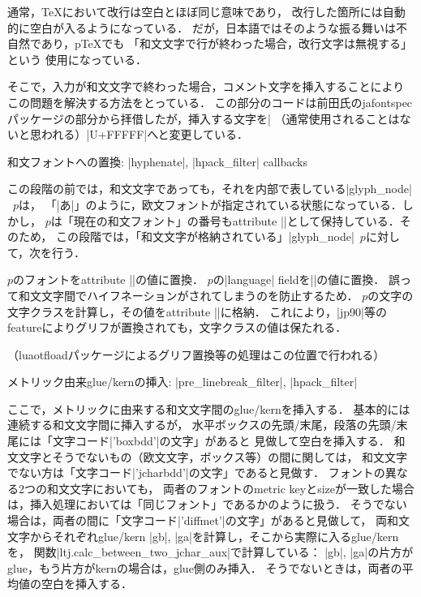 通常，\TeX において改行は空白とほぼ同じ意味であり，
改行した箇所には自動的に空白が入るようになっている．
だが，日本語ではそのような振る舞いは不自然であり，p\TeX でも
「和文文字で行が終わった場合，改行文字は無視する」という
使用になっている．

そこで，入力が和文文字で終わった場合，コメント文字を挿入することにより
この問題を解決する方法をとっている．
この部分のコードは前田氏のjafontspecパッケージの部分から拝借したが，挿入する文字を|%
（通常使用されることはないと思われる）|U+FFFFF|へと変更している．

\item 和文フォントへの置換: |hyphenate|, |hpack_filter| callbacks

この段階の前では，和文文字であっても，それを内部で表している|glyph_node|~$p$は，
「|\temrm あ|」のように，欧文フォントが指定されている状態になっている．しかし，
$p$は「現在の和文フォント」の番号もattribute |\luatexja@curjfn|として保持している．そのため，
この段階では，「和文文字が格納されている」|glyph_node|~$p$に対して，次を行う．

\itemitem $p$のフォントをattribute |\luatexja@curjfn|の値に置換．
\itemitem $p$の|language| fieldを|\luatexja@japanese|の値に置換．
誤って和文文字間でハイフネーションがされてしまうのを防止するため．
\itemitem $p$の文字の文字クラスを計算し，その値をattribute |\luatexja@charclass|に格納．
これにより，|jp90|等のfeatureによりグリフが置換されても，文字クラスの値は保たれる．

\item （luaotfloadパッケージによるグリフ置換等の処理はこの位置で行われる）

\item メトリック由来glue/kernの挿入: |pre_linebreak_filter|, |hpack_filter|

ここで，メトリックに由来する和文文字間のglue/kernを挿入する．
基本的には連続する和文文字間に挿入するが，
\itemitem 水平ボックスの先頭/末尾，段落の先頭/末尾には「文字コード|'boxbdd'|の文字」があると
見做して空白を挿入する．
\itemitem 和文文字とそうでないもの（欧文文字，ボックス等）の間に関しては，
和文文字でない方は「文字コード|'jcharbdd'|の文字」であると見做す．
\itemitem フォントの異なる2つの和文文字においても，
両者のフォントのmetric keyとsizeが一致した場合は，挿入処理においては「同じフォント」であるかのように扱う．
\itemitem  そうでない場合は，両者の間に「文字コード|'diffmet'|の文字」があると見做して，
両和文文字からそれぞれglue/kern |gb|, |ga|を計算し，そこから実際に入るglue/kernを，
関数|ltj.calc_between_two_jchar_aux|で計算している：
\itemT |gb|, |ga|の片方がglue，もう片方がkernの場合は，glue側のみ挿入．
\itemT そうでないときは，両者の平均値の空白を挿入する．

